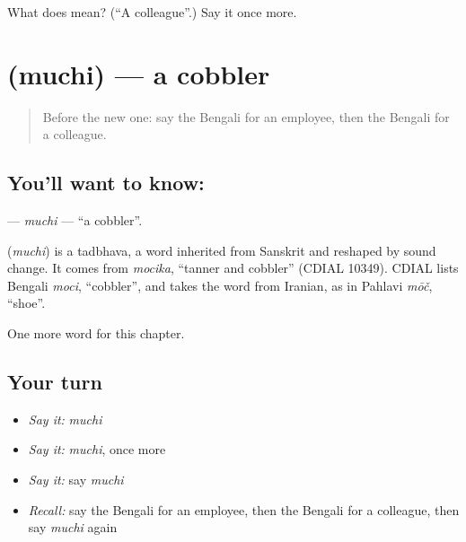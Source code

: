 \begin{tcolorbox}[breakable,colback=teal!4,colframe=teal!35!black,title={Before you move on}]
What does  mean? (\textquotedblleft{}A colleague\textquotedblright{}.) Say it once more.
\end{tcolorbox}
\section[\texorpdfstring{\bn{মুচি} (muchi)}{মুচি (muchi)}]{ (muchi) — a cobbler}

\label{lesson:BN-C235-muchi}



\begin{quote}
Before the new one: say the Bengali for an employee, then the Bengali for a colleague.
\end{quote}

\subsection*{You'll want to know: }
\textbf{} — \emph{muchi} — \textquotedblleft{}a cobbler\textquotedblright{}.

\begin{cousinweb}
\textbf{} (\emph{muchi}) is a tadbhava, a word inherited from Sanskrit and reshaped by sound change. It comes from \emph{mocika}, \textquotedblleft{}tanner and cobbler\textquotedblright{} (CDIAL 10349). CDIAL lists Bengali \emph{moci}, \textquotedblleft{}cobbler\textquotedblright{}, and takes the word from Iranian, as in Pahlavi \emph{mōč}, \textquotedblleft{}shoe\textquotedblright{}.
\end{cousinweb}

\begin{grammarlens}[title={What you've built}]
One more word for this chapter.
\end{grammarlens}

\subsection*{Your turn}
\begin{itemize}
\raggedright
  \item \emph{Say it:} \emph{muchi}
  \item \emph{Say it:} \emph{muchi}, once more
  \item \emph{Say it:} say \emph{muchi}
  \item \emph{Recall:} say the Bengali for an employee, then the Bengali for a colleague, then say \emph{muchi} again
\end{itemize}

